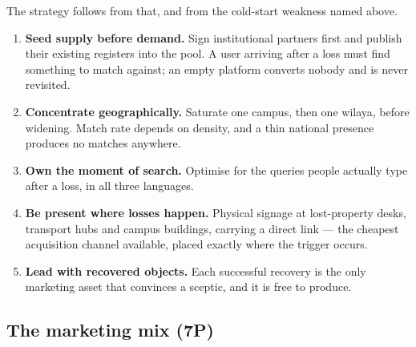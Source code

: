 The strategy follows from that, and from the cold-start weakness named above.

\begin{enumerate}[leftmargin=1.6em,itemsep=4pt]
  \item \textbf{Seed supply before demand.} Sign institutional partners first
        and publish their existing registers into the pool. A user arriving
        after a loss must find something to match against; an empty platform
        converts nobody and is never revisited.
  \item \textbf{Concentrate geographically.} Saturate one campus, then one
        wilaya, before widening. Match rate depends on density, and a thin
        national presence produces no matches anywhere.
  \item \textbf{Own the moment of search.} Optimise for the queries people
        actually type after a loss, in all three languages.
  \item \textbf{Be present where losses happen.} Physical signage at
        lost-property desks, transport hubs and campus buildings, carrying a
        direct link --- the cheapest acquisition channel available, placed
        exactly where the trigger occurs.
  \item \textbf{Lead with recovered objects.} Each successful recovery is the
        only marketing asset that convinces a sceptic, and it is free to
        produce.
\end{enumerate}

\subsection{The marketing mix (7P)}

